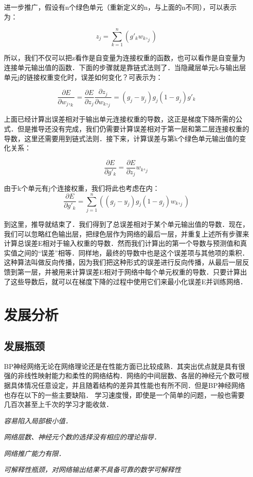 进一步推广，假设有n个绿色单元（重新定义的n，与上面的n不同），可以表示为：

$$z_j=\sum_{k=1}^n (g'_k w_k,_j)$$

所以，我们不仅可以把z看作是自变量为连接权重的函数，也可以看作是自变量为连接单元输出值的函数．下面的步骤就是靠链式法则了．当隐藏层单元k与输出层单元j的链接权重变化时，误差如何变化？可表示为：

$$\frac{\partial E}{\partial w_j,_k}=\frac{\partial E}{\partial z_j} \frac{\partial z_j}{\partial w_k,_j} = (g_j-y_j)g_j(1-g_j)g'_k$$

上面已经计算出误差相对于输出单元连接权重的导数，这正是梯度下降所需的公式．但是推导还没有完成，我们仍需要计算误差相对于第一层和第二层连接权重的导数，这里还需要用到链式法则．接下来，计算误差与第k个绿色单元输出值的变化关系：

$$\frac{\partial E}{\partial g'_k} = \frac{\partial E}{\partial z_j}w_k,_j$$

由于k个单元有j个连接权重，我们将此也考虑在内：
$$\frac{\partial E}{\partial g'_k} = \sum_{j=1}^n ((g_j-y_j)g_j(1-g_j)w_k,_j)$$

到这里，推导就结束了．我们得到了总误差相对于某个单元输出值的导数．现在，我们可以忽略红色输出层，把绿色层作为网络的最后一层，并重复上述所有步骤来计算总误差E相对于输入权重的导数．然而我们计算出的第一个导数与预测值和真实值之间的“误差”相等．同样地，最终的导数中也是这个误差项与其他项的乘积．这种算法叫做反向传播，因为我们把这种形式的误差进行反向传播，从最后一层反馈到第一层，并被用来计算误差E相对于网络中每个单元权重的导数．只要计算出了这些导数后，就可以在梯度下降的过程中使用它们来最小化误差E并训练网络．
\section{发展分析}
\subsection{发展瓶颈}
BP神经网络无论在网络理论还是在性能方面已比较成熟．其突出优点就是具有很强的非线性映射能力和柔性的网络结构．网络的中间层数、各层的神经元个数可根据具体情况任意设定，并且随着结构的差异其性能也有所不同．但是BP神经网络也存在以下的一些主要缺陷．
学习速度慢，即使是一个简单的问题，一般也需要几百次甚至上千次的学习才能收敛．

\emph{容易陷入局部极小值．}

\emph{网络层数、神经元个数的选择没有相应的理论指导．}

\emph{网络推广能力有限．}

\emph{可解释性瓶颈，对网络输出结果不具备可靠的数学可解释性}

